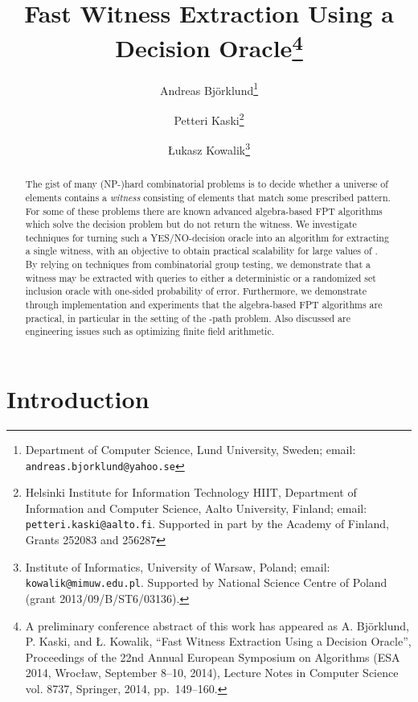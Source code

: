 \documentclass[11pt]{article}
\begin{document}
\title{Fast Witness Extraction Using a Decision Oracle\thanks{A preliminary conference abstract of this work has appeared as A. Bj\"orklund, P. Kaski, and \L. Kowalik, ``Fast Witness Extraction Using a Decision Oracle'', Proceedings of the 22nd Annual European Symposium on Algorithms (ESA 2014, Wroc{\l}aw, September 8--10, 2014),  Lecture Notes in Computer Science vol. 8737, Springer, 2014, pp.~149--160.}}
\author{
  Andreas Bj\"orklund\thanks{Department of Computer Science, Lund University, Sweden; email: \texttt{andreas.bjorklund@yahoo.se}}
  \and
  Petteri Kaski\thanks{Helsinki Institute for Information Technology HIIT, Department of Information and Computer Science, Aalto University, Finland; email:
\texttt{petteri.kaski@aalto.fi}. Supported in part by the Academy of Finland, Grants 252083 and 256287}
  \and
  \L{}ukasz Kowalik\thanks{Institute of Informatics, University of Warsaw, Poland; email: \texttt{kowalik@mimuw.edu.pl}. Supported by National Science Centre of Poland (grant 2013/09/B/ST6/03136).}
}

\date{}

\maketitle

\begin{abstract}
The gist of many (NP-)hard combinatorial problems is to decide
whether a universe of  elements contains a {\em witness} consisting 
of  elements that match some prescribed pattern. 
For some of these problems there are known advanced algebra-based 
FPT algorithms which solve the decision problem but do not return the witness.
We investigate techniques for turning such a YES/NO-decision oracle into 
an algorithm for extracting a single witness,
with an objective to obtain practical scalability for large values of .
By relying on techniques from combinatorial group testing, we demonstrate
that a witness may be extracted with  queries to 
either a deterministic or a randomized set inclusion oracle with one-sided
probability of error. Furthermore, we demonstrate through implementation
and experiments that the algebra-based FPT algorithms are practical,
in particular in the setting of the -path problem. Also discussed
are engineering issues such as optimizing finite field arithmetic.
\end{abstract}






\section{Introduction}
\end{document}
